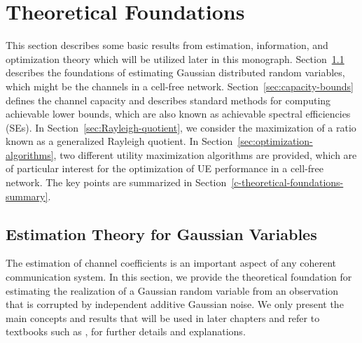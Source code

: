 
\chapter{Theoretical Foundations}
\label{c-theoretical-foundations} 

\vspace{-5mm}

This section describes some basic results from estimation, information, and optimization theory which will be utilized later in this monograph. Section~\ref{sec:estimation-theory} describes the foundations of estimating Gaussian distributed random variables, which might be the channels in a cell-free network. Section~\ref{sec:capacity-bounds} defines the channel capacity and describes standard methods for computing achievable lower bounds, which are also known as achievable spectral efficiencies (SEs). 
In Section~\ref{sec:Rayleigh-quotient}, we consider the maximization of a ratio known as a generalized Rayleigh quotient.
In Section~\ref{sec:optimization-algorithms}, two different utility maximization algorithms are provided, which are of particular interest for the optimization of UE performance in a cell-free network. The key points are summarized in Section~\ref{c-theoretical-foundations-summary}.



\enlargethispage{\baselineskip} 

\section{Estimation Theory for Gaussian Variables}
\label{sec:estimation-theory}

The estimation of channel coefficients is an important aspect of any coherent communication system. In this section, we provide the theoretical foundation for estimating the realization of a Gaussian random variable from an observation that is corrupted by independent additive Gaussian noise. We only present the main concepts and results that will be used in later chapters and refer to textbooks such as \cite{massivemimobook}, \cite{Kay1993a} for further details and explanations.

